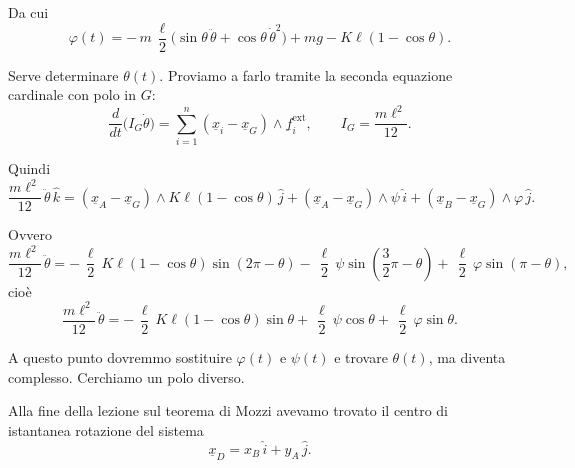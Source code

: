 \begin{example}{}
Da cui
\[
\varphi(t)
=
-\,m\,\frac{\ell}{2}\bigl(\sin\theta\,\ddot{\theta}+\cos\theta\,\dot{\theta}^{2}\bigr)
+mg-K\ell(1-\cos\theta).
\]

Serve determinare \(\theta(t)\). Proviamo a farlo tramite la seconda equazione
cardinale con polo in \(G\):
\[
\frac{d}{dt}\bigl(I_G\dot{\theta}\bigr)
=
\sum_{i=1}^{n}(\underline{x}_i-\underline{x}_G)\wedge \underline{f}_i^{\mathrm{ext}},
\qquad
I_G=\frac{m\ell^{2}}{12}.
\]

Quindi
\[
\frac{m\ell^{2}}{12}\,\ddot{\theta}\,\hat{k}
=
(\underline{x}_A-\underline{x}_G)\wedge K\ell(1-\cos\theta)\,\hat{j}
+
(\underline{x}_A-\underline{x}_G)\wedge \psi\,\hat{i}
+
(\underline{x}_B-\underline{x}_G)\wedge \varphi\,\hat{j}.
\]

Ovvero
\[
\frac{m\ell^{2}}{12}\,\ddot{\theta}
=
-\,\frac{\ell}{2}\,K\ell(1-\cos\theta)\sin(2\pi-\theta)
-\,\frac{\ell}{2}\,\psi\sin\!\left(\frac{3}{2}\pi-\theta\right)
+\,\frac{\ell}{2}\,\varphi\sin(\pi-\theta),
\]
cioè
\[
\frac{m\ell^{2}}{12}\,\ddot{\theta}
=
-\,\frac{\ell}{2}\,K\ell(1-\cos\theta)\sin\theta
+\,\frac{\ell}{2}\,\psi\cos\theta
+\,\frac{\ell}{2}\,\varphi\sin\theta.
\]

A questo punto dovremmo sostituire \(\varphi(t)\) e \(\psi(t)\) e trovare
\(\theta(t)\), ma diventa complesso. Cerchiamo un polo diverso.

Alla fine della lezione sul teorema di Mozzi avevamo trovato il centro di
istantanea rotazione del sistema
\[
\underline{x}_D=x_B\,\hat{i}+y_A\,\hat{j}.
\]

\end{example}
